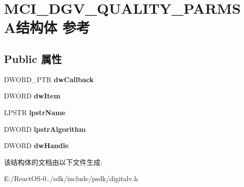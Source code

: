 \hypertarget{struct_m_c_i___d_g_v___q_u_a_l_i_t_y___p_a_r_m_s_a}{}\section{M\+C\+I\+\_\+\+D\+G\+V\+\_\+\+Q\+U\+A\+L\+I\+T\+Y\+\_\+\+P\+A\+R\+M\+S\+A结构体 参考}
\label{struct_m_c_i___d_g_v___q_u_a_l_i_t_y___p_a_r_m_s_a}
\subsection*{Public 属性}
\begin{DoxyCompactItemize}
\item 
\mbox{\label{struct_m_c_i___d_g_v___q_u_a_l_i_t_y___p_a_r_m_s_a_a29986e4250ba6034710da4e17c99a338}} 
D\+W\+O\+R\+D\+\_\+\+P\+TR {\bfseries dw\+Callback}
\item 
\mbox{\label{struct_m_c_i___d_g_v___q_u_a_l_i_t_y___p_a_r_m_s_a_a1dc2b4c421a60cd1329554e3ab499da4}} 
D\+W\+O\+RD {\bfseries dw\+Item}
\item 
\mbox{\label{struct_m_c_i___d_g_v___q_u_a_l_i_t_y___p_a_r_m_s_a_ab091dc0a9c7761d802cf5577bcb1d1c8}} 
L\+P\+S\+TR {\bfseries lpstr\+Name}
\item 
\mbox{\label{struct_m_c_i___d_g_v___q_u_a_l_i_t_y___p_a_r_m_s_a_aa948c25ff84436941d48ae66d0329a6d}} 
D\+W\+O\+RD {\bfseries lpstr\+Algorithm}
\item 
\mbox{\label{struct_m_c_i___d_g_v___q_u_a_l_i_t_y___p_a_r_m_s_a_a8f989a7bca16736c607207752621c6c4}} 
D\+W\+O\+RD {\bfseries dw\+Handle}
\end{DoxyCompactItemize}


该结构体的文档由以下文件生成\+:\begin{DoxyCompactItemize}
\item 
E\+:/\+React\+O\+S-\/0../sdk/include/psdk/digitalv.\+h\end{DoxyCompactItemize}
